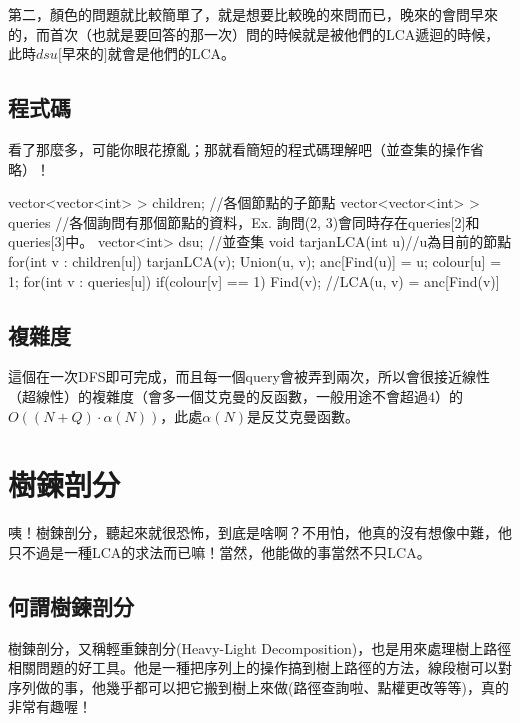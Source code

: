 		第二，顏色的問題就比較簡單了，就是想要比較晚的來問而已，晚來的會問早來的，而首次（也就是要回答的那一次）問的時候就是被他們的LCA遞迴的時候，此時$dsu[$早來的$]$就會是他們的LCA。
		\subsection{程式碼}
			看了那麼多，可能你眼花撩亂；那就看簡短的程式碼理解吧（並查集的操作省略）！
		\begin{C++}
vector<vector<int> > children; //各個節點的子節點
vector<vector<int> > queries //各個詢問有那個節點的資料，Ex. 詢問(2, 3)會同時存在queries[2]和queries[3]中。
vector<int> dsu; //並查集
void tarjanLCA(int u){//u為目前的節點
	for(int v : children[u]){
		tarjanLCA(v);
		Union(u, v);
		anc[Find(u)] = u;
	}
	colour[u] = 1;
	for(int v : queries[u]){
		if(colour[v] == 1){
			Find(v);
			//LCA(u, v) = anc[Find(v)]
		}
	}
}
		\end{C++}
	\subsection{複雜度}
		這個在一次DFS即可完成，而且每一個query會被弄到兩次，所以會很接近線性（超線性）的複雜度（會多一個艾克曼的反函數，一般用途不會超過$4$）的$O((N + Q) \cdot \alpha(N))$，此處$\alpha(N)$是反艾克曼函數。
	\section{樹鍊剖分}
	
	咦！樹鍊剖分，聽起來就很恐怖，到底是啥啊？不用怕，他真的沒有想像中難，他只不過是一種LCA的求法而已嘛！當然，他能做的事當然不只LCA。
	\subsection{何謂樹鍊剖分}
	樹鍊剖分，又稱輕重鍊剖分(Heavy-Light Decomposition)，也是用來處理樹上路徑相關問題的好工具。他是一種把序列上的操作搞到樹上路徑的方法，線段樹可以對序列做的事，他幾乎都可以把它搬到樹上來做(路徑查詢啦、點權更改等等)，真的非常有趣喔！
		
